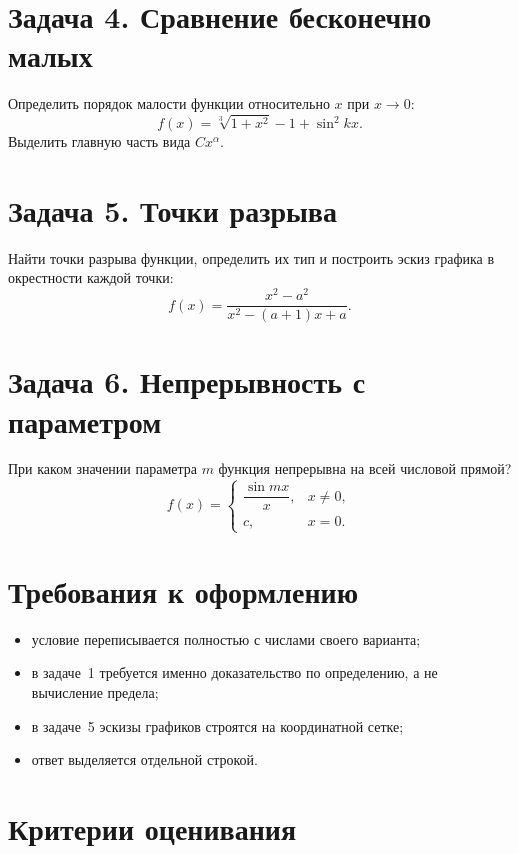 \documentclass[12pt, a4paper]{article}
\begin{document}
\section*{Задача 4. Сравнение бесконечно малых}

Определить порядок малости функции относительно $x$ при $x\to 0$:
\[
f(x) = \sqrt[3]{1 + x^2} - 1 + \sin^2 kx.
\]
Выделить главную часть вида $Cx^{\alpha}$.

\section*{Задача 5. Точки разрыва}

Найти точки разрыва функции, определить их тип и построить эскиз графика
в окрестности каждой точки:
\[
f(x) = \frac{x^2 - a^2}{x^2 - (a + 1)x + a}.
\]

\section*{Задача 6. Непрерывность с параметром}

При каком значении параметра $m$ функция непрерывна на всей числовой прямой?
\[
f(x) =
\begin{cases}
\dfrac{\sin mx}{x}, & x \ne 0, \\[2mm]
c, & x = 0.
\end{cases}
\]

\vspace{1.2em}

\section*{Требования к оформлению}

\begin{itemize}[nosep]
  \item условие переписывается полностью с числами своего варианта;
  \item в задаче~1 требуется именно доказательство по определению, а не вычисление предела;
  \item в задаче~5 эскизы графиков строятся на координатной сетке;
  \item ответ выделяется отдельной строкой.
\end{itemize}

\section*{Критерии оценивания}
\end{document}
